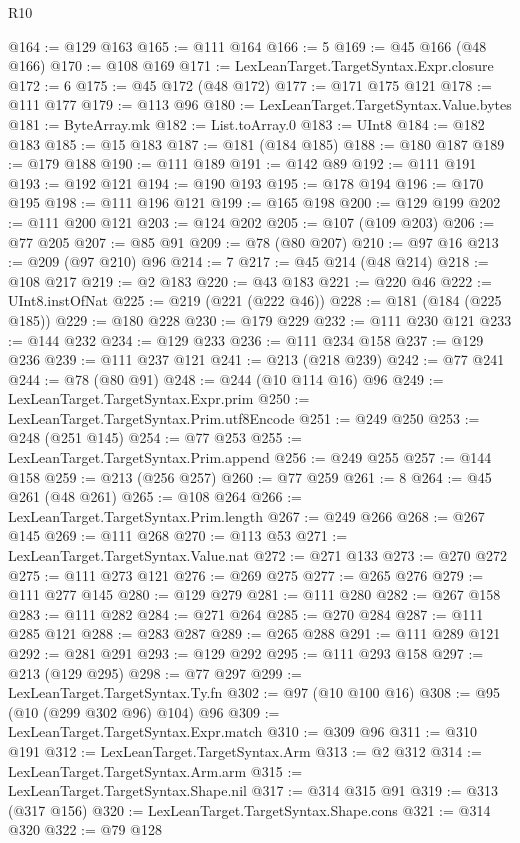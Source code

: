 \begin{lexlean}{R10}
\begin{coremodule}
@164 := @129 @163
@165 := @111 @164
@166 := 5
@169 := @45 @166 (@48 @166)
@170 := @108 @169
@171 := LexLeanTarget.TargetSyntax.Expr.closure
@172 := 6
@175 := @45 @172 (@48 @172)
@177 := @171 @175 @121
@178 := @111 @177
@179 := @113 @96
@180 := LexLeanTarget.TargetSyntax.Value.bytes
@181 := ByteArray.mk
@182 := List.toArray.{0}
@183 := UInt8
@184 := @182 @183
@185 := @15 @183
@187 := @181 (@184 @185)
@188 := @180 @187
@189 := @179 @188
@190 := @111 @189
@191 := @142 @89
@192 := @111 @191
@193 := @192 @121
@194 := @190 @193
@195 := @178 @194
@196 := @170 @195
@198 := @111 @196 @121
@199 := @165 @198
@200 := @129 @199
@202 := @111 @200 @121
@203 := @124 @202
@205 := @107 (@109 @203)
@206 := @77 @205
@207 := @85 @91
@209 := @78 (@80 @207)
@210 := @97 @16
@213 := @209 (@97 @210) @96
@214 := 7
@217 := @45 @214 (@48 @214)
@218 := @108 @217
@219 := @2 @183
@220 := @43 @183
@221 := @220 @46
@222 := UInt8.instOfNat
@225 := @219 (@221 (@222 @46))
@228 := @181 (@184 (@225 @185))
@229 := @180 @228
@230 := @179 @229
@232 := @111 @230 @121
@233 := @144 @232
@234 := @129 @233
@236 := @111 @234 @158
@237 := @129 @236
@239 := @111 @237 @121
@241 := @213 (@218 @239)
@242 := @77 @241
@244 := @78 (@80 @91)
@248 := @244 (@10 @114 @16) @96
@249 := LexLeanTarget.TargetSyntax.Expr.prim
@250 := LexLeanTarget.TargetSyntax.Prim.utf8Encode
@251 := @249 @250
@253 := @248 (@251 @145)
@254 := @77 @253
@255 := LexLeanTarget.TargetSyntax.Prim.append
@256 := @249 @255
@257 := @144 @158
@259 := @213 (@256 @257)
@260 := @77 @259
@261 := 8
@264 := @45 @261 (@48 @261)
@265 := @108 @264
@266 := LexLeanTarget.TargetSyntax.Prim.length
@267 := @249 @266
@268 := @267 @145
@269 := @111 @268
@270 := @113 @53
@271 := LexLeanTarget.TargetSyntax.Value.nat
@272 := @271 @133
@273 := @270 @272
@275 := @111 @273 @121
@276 := @269 @275
@277 := @265 @276
@279 := @111 @277 @145
@280 := @129 @279
@281 := @111 @280
@282 := @267 @158
@283 := @111 @282
@284 := @271 @264
@285 := @270 @284
@287 := @111 @285 @121
@288 := @283 @287
@289 := @265 @288
@291 := @111 @289 @121
@292 := @281 @291
@293 := @129 @292
@295 := @111 @293 @158
@297 := @213 (@129 @295)
@298 := @77 @297
@299 := LexLeanTarget.TargetSyntax.Ty.fn
@302 := @97 (@10 @100 @16)
@308 := @95 (@10 (@299 @302 @96) @104) @96
@309 := LexLeanTarget.TargetSyntax.Expr.match
@310 := @309 @96
@311 := @310 @191
@312 := LexLeanTarget.TargetSyntax.Arm
@313 := @2 @312
@314 := LexLeanTarget.TargetSyntax.Arm.arm
@315 := LexLeanTarget.TargetSyntax.Shape.nil
@317 := @314 @315 @91
@319 := @313 (@317 @156)
@320 := LexLeanTarget.TargetSyntax.Shape.cons
@321 := @314 @320
@322 := @79 @128

\end{coremodule}
\end{lexlean}
